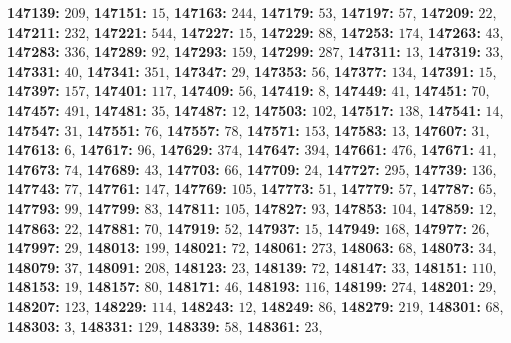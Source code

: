 \textsf{\bfseries 147139:} $209$, \textsf{\bfseries 147151:} $15$, \textsf{\bfseries 147163:} $244$, \textsf{\bfseries 147179:} $53$, \textsf{\bfseries 147197:} $57$, \textsf{\bfseries 147209:} $22$, \textsf{\bfseries 147211:} $232$, \textsf{\bfseries 147221:} $544$, \textsf{\bfseries 147227:} $15$, \textsf{\bfseries 147229:} $88$, \textsf{\bfseries 147253:} $174$, \textsf{\bfseries 147263:} $43$, \textsf{\bfseries 147283:} $336$, \textsf{\bfseries 147289:} $92$, \textsf{\bfseries 147293:} $159$, \textsf{\bfseries 147299:} $287$, \textsf{\bfseries 147311:} $13$, \textsf{\bfseries 147319:} $33$, \textsf{\bfseries 147331:} $40$, \textsf{\bfseries 147341:} $351$, \textsf{\bfseries 147347:} $29$, \textsf{\bfseries 147353:} $56$, \textsf{\bfseries 147377:} $134$, \textsf{\bfseries 147391:} $15$, \textsf{\bfseries 147397:} $157$, \textsf{\bfseries 147401:} $117$, \textsf{\bfseries 147409:} $56$, \textsf{\bfseries 147419:} $8$, \textsf{\bfseries 147449:} $41$, \textsf{\bfseries 147451:} $70$, \textsf{\bfseries 147457:} $491$, \textsf{\bfseries 147481:} $35$, \textsf{\bfseries 147487:} $12$, \textsf{\bfseries 147503:} $102$, \textsf{\bfseries 147517:} $138$, \textsf{\bfseries 147541:} $14$, \textsf{\bfseries 147547:} $31$, \textsf{\bfseries 147551:} $76$, \textsf{\bfseries 147557:} $78$, \textsf{\bfseries 147571:} $153$, \textsf{\bfseries 147583:} $13$, \textsf{\bfseries 147607:} $31$, \textsf{\bfseries 147613:} $6$, \textsf{\bfseries 147617:} $96$, \textsf{\bfseries 147629:} $374$, \textsf{\bfseries 147647:} $394$, \textsf{\bfseries 147661:} $476$, \textsf{\bfseries 147671:} $41$, \textsf{\bfseries 147673:} $74$, \textsf{\bfseries 147689:} $43$, \textsf{\bfseries 147703:} $66$, \textsf{\bfseries 147709:} $24$, \textsf{\bfseries 147727:} $295$, \textsf{\bfseries 147739:} $136$, \textsf{\bfseries 147743:} $77$, \textsf{\bfseries 147761:} $147$, \textsf{\bfseries 147769:} $105$, \textsf{\bfseries 147773:} $51$, \textsf{\bfseries 147779:} $57$, \textsf{\bfseries 147787:} $65$, \textsf{\bfseries 147793:} $99$, \textsf{\bfseries 147799:} $83$, \textsf{\bfseries 147811:} $105$, \textsf{\bfseries 147827:} $93$, \textsf{\bfseries 147853:} $104$, \textsf{\bfseries 147859:} $12$, \textsf{\bfseries 147863:} $22$, \textsf{\bfseries 147881:} $70$, \textsf{\bfseries 147919:} $52$, \textsf{\bfseries 147937:} $15$, \textsf{\bfseries 147949:} $168$, \textsf{\bfseries 147977:} $26$, \textsf{\bfseries 147997:} $29$, \textsf{\bfseries 148013:} $199$, \textsf{\bfseries 148021:} $72$, \textsf{\bfseries 148061:} $273$, \textsf{\bfseries 148063:} $68$, \textsf{\bfseries 148073:} $34$, \textsf{\bfseries 148079:} $37$, \textsf{\bfseries 148091:} $208$, \textsf{\bfseries 148123:} $23$, \textsf{\bfseries 148139:} $72$, \textsf{\bfseries 148147:} $33$, \textsf{\bfseries 148151:} $110$, \textsf{\bfseries 148153:} $19$, \textsf{\bfseries 148157:} $80$, \textsf{\bfseries 148171:} $46$, \textsf{\bfseries 148193:} $116$, \textsf{\bfseries 148199:} $274$, \textsf{\bfseries 148201:} $29$, \textsf{\bfseries 148207:} $123$, \textsf{\bfseries 148229:} $114$, \textsf{\bfseries 148243:} $12$, \textsf{\bfseries 148249:} $86$, \textsf{\bfseries 148279:} $219$, \textsf{\bfseries 148301:} $68$, \textsf{\bfseries 148303:} $3$, \textsf{\bfseries 148331:} $129$, \textsf{\bfseries 148339:} $58$, \textsf{\bfseries 148361:} $23$, 
